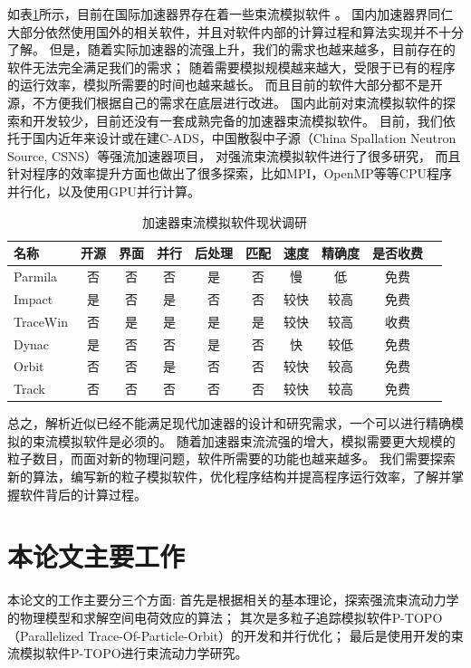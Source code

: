 如表\ref{tab:space_charge_code}所示，目前在国际加速器界存在着一些束流模拟软件
\cite{cern_codeList,ryne1996beam,takeda1998PARMILA,qiang1999impact,uriot2014tracewin,tanke2002dynac,shishlo2006orbit,aseev2005track}。
国内加速器界同仁大部分依然使用国外的相关软件，并且对软件内部的计算过程和算法实现并不十分了解。
但是，随着实际加速器的流强上升，我们的需求也越来越多，目前存在的软件无法完全满足我们的需求；
随着需要模拟规模越来越大，受限于已有的程序的运行效率，模拟所需要的时间也越来越长。
而且目前的软件大部分都不是开源，不方便我们根据自己的需求在底层进行改进。
国内此前对束流模拟软件的探索和开发较少，目前还没有一套成熟完备的加速器束流模拟软件。
目前，我们依托于国内近年来设计或在建C-ADS，中国散裂中子源（China Spallation Neutron Source, CSNS）等强流加速器项目，
对强流束流模拟软件进行了很多研究，
而且针对程序的效率提升方面也做出了很多探索，比如MPI，OpenMP等等CPU程序并行化，以及使用GPU并行计算。

\begin{table}
  \centering
  \caption{加速器束流模拟软件现状调研}
  \begin{tabular}{|>{\small}l|c|c|c|c|c|c|c|c|c|}
    \hline
    名称	        &开源     &界面       &并行	&后处理     &匹配	&速度 &精确度	 & 是否收费  \\
    \hline
    Parmila  	&否	   &否	   &否	&是	     &否 	&慢	 &低	     & 免费	\\
    Impact  	&是	   &否	   &是	&否	     &否	    &较快 &较高	 & 免费	\\
    TraceWin  	&否	   &是	   &是	&是	     &是	    &较快 &较高	 & 收费	\\
    Dynac  	    &是	   &否	   &否	&是	     &否	    &快     &较低	 & 免费	\\
    Orbit  	    &否	   &否	   &是	&否	     &否	    &较快 &较高	 & 免费	\\
    Track  	    &否	   &否	   &否	&否	     &否 	&较快 &较高	 & 免费	\\
    \hline
  \end{tabular}
  \label{tab:space_charge_code}
\end{table}

总之，解析近似已经不能满足现代加速器的设计和研究需求，一个可以进行精确模拟的束流模拟软件是必须的。
随着加速器束流流强的增大，模拟需要更大规模的粒子数目，而面对新的物理问题，软件所需要的功能也越来越多。
我们需要探索新的算法，编写新的粒子模拟软件，优化程序结构并提高程序运行效率，了解并掌握软件背后的计算过程。

\section{本论文主要工作}
本论文的工作主要分三个方面:
首先是根据相关的基本理论，探索强流束流动力学的物理模型和求解空间电荷效应的算法；
其次是多粒子追踪模拟软件P-TOPO（Parallelized Trace-Of-Particle-Orbit）的开发和并行优化；
最后是使用开发的束流模拟软件P-TOPO进行束流动力学研究。

